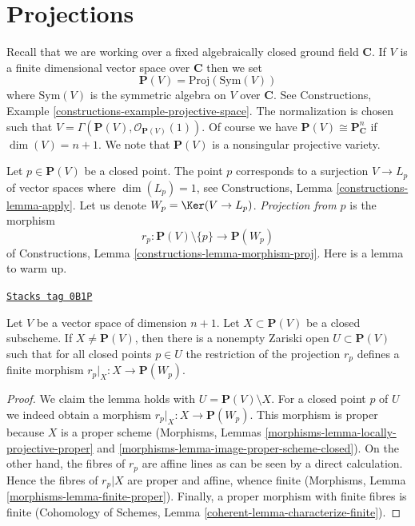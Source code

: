 \section{Projections}
\label{intersection-section-projection}
Recall that we are working over a fixed algebraically closed ground field
$\mathbf{C}$. If $V$ is a finite dimensional vector space over $\mathbf{C}$
then we set
$$
\mathbf{P}(V) = \text{Proj}(\text{Sym}(V))
$$
where $\text{Sym}(V)$ is the symmetric algebra on $V$ over $\mathbf{C}$.
See Constructions, Example \ref{constructions-example-projective-space}.
The normalization is chosen such that
$V = \Gamma(\mathbf{P}(V), \mathcal{O}_{\mathbf{P}(V)}(1))$.
Of course we have $\mathbf{P}(V) \cong \mathbf{P}^n_{\mathbf{C}}$ if
$\dim(V) = n + 1$. We note that $\mathbf{P}(V)$ is a nonsingular projective
variety.

\medskip\noindent
Let $p \in \mathbf{P}(V)$ be a closed point. The point $p$ corresponds to a
surjection $V \to L_p$ of vector spaces where $\dim(L_p) = 1$, see
Constructions, Lemma \ref{constructions-lemma-apply}.
Let us denote $W_p = \Ker(V \to L_p)$.
{\it Projection from $p$} is the morphism
$$
r_p : \mathbf{P}(V) \setminus \{p\} \longrightarrow \mathbf{P}(W_p)
$$
of Constructions, Lemma \ref{constructions-lemma-morphism-proj}.
Here is a lemma to warm up.

\begin{lemma}
\label{intersection-lemma-projection-generically-finite}
\href{https://stacks.math.columbia.edu/tag/0B1P}{\texttt{Stacks tag 0B1P}}

Let $V$ be a vector space of dimension $n + 1$.
Let $X \subset \mathbf{P}(V)$ be a closed subscheme.
If $X \not = \mathbf{P}(V)$, then there is a nonempty Zariski open
$U \subset \mathbf{P}(V)$
such that for all closed points $p \in U$ the restriction
of the projection $r_p$ defines a finite morphism
$r_p|_X : X \to \mathbf{P}(W_p)$.
\end{lemma}

\begin{proof}
We claim the lemma holds with $U = \mathbf{P}(V) \setminus X$. For a closed
point $p$ of $U$ we indeed obtain a morphism $r_p|_X : X \to \mathbf{P}(W_p)$.
This morphism is proper because $X$ is a proper scheme
(Morphisms, Lemmas \ref{morphisms-lemma-locally-projective-proper} and
\ref{morphisms-lemma-image-proper-scheme-closed}). On the other hand, the
fibres of $r_p$ are affine lines as can be seen by a direct calculation.
Hence the fibres of $r_p|X$ are proper and affine, whence finite
(Morphisms, Lemma \ref{morphisms-lemma-finite-proper}).
Finally, a proper morphism with finite fibres is finite
(Cohomology of Schemes, Lemma \ref{coherent-lemma-characterize-finite}).
\end{proof}

